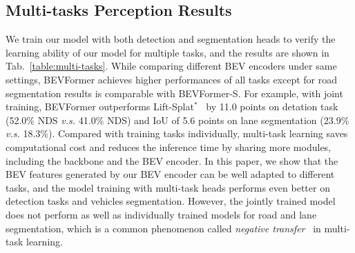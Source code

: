 \documentclass{article}
\begin{document}
\subsection{Multi-tasks Perception Results}
We train our model with both detection and segmentation heads to verify the learning ability of our model for multiple tasks, and the results are shown in Tab.~\ref{table:multi-tasks}. 
While comparing different BEV encoders under same settings, BEVFormer achieves higher performances of all tasks except for road segmentation results is comparable with BEVFormer-S. For example, with joint training, BEVFormer outperforms Lift-Splat$^*$~\cite{philion2020lift} by 11.0 points on detation task (52.0\% NDS \emph{v.s.} 41.0\% NDS) and IoU of 5.6 points on lane segmentation (23.9\% \emph{v.s.} 18.3\%).
Compared with training tasks individually, multi-task learning  saves computational cost and reduces the inference time by sharing more modules, including the backbone and the BEV encoder. In this paper, we show that the BEV features generated by our BEV encoder can be well adapted to different tasks, and the model training with multi-task heads performs even better on detection tasks and vehicles segmentation. However, the jointly trained model does not perform as well as individually trained models for road and lane segmentation, which is a common phenomenon called \textit{negative transfer}~\cite{crawshaw2020multi,fifty2021efficiently} in multi-task learning.
\end{document}
